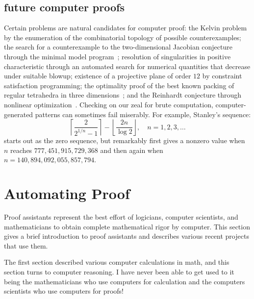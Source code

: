 \documentclass{llncs}
\begin{document}
\subsection{future computer proofs}

Certain problems are natural candidates for computer proof: the Kelvin
problem by the enumeration of the combinatorial topology of possible
counterexamples; the search for a counterexample to the
two-dimensional Jacobian conjecture through the minimal model
program~\cite{Borisov}; resolution of singularities in positive
characteristic through an automated search for numerical quantities
that decrease under suitable blowup; existence of a projective plane
of order $12$ by constraint satisfaction programming; the optimality
proof of the best known packing of regular tetrahedra in three
dimensions~\cite{Chen-2010}; and the Reinhardt conjecture through
nonlinear optimization~\cite{HR11}.  Checking on our zeal for brute
computation, computer-generated patterns can sometimes fail miserably.
For example, Stanley's sequence:
\[
\left\lceil{\frac{2}{2^{1/n} - 1}}\right\rceil- 
\left\lfloor{\frac{2 n}{\log 2}}\right\rfloor,\quad n=1,2,3,\ldots
\]
starts out as the zero sequence, but remarkably first gives a nonzero
value when $n$ reaches $777,451,915,729,368$ and then again when
$n=140,894,092,055,857,794$.





\newpage
\section{Automating Proof}

Proof assistants represent the best effort of logicians, computer
scientists, and mathematicians to obtain complete mathematical rigor
by computer.  This section gives a brief introduction to proof
assistants and describes various recent projects that use them.

The first section described various computer calculations in math,
and this section turns to computer reasoning.  I have never been able to
get used to it being the mathematicians who use computers for calculation
and the computers scientists who use computers for proofs!
\end{document}
